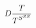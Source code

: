 \def\puzzle{{\mathchoice{D}{T}{S}{SS}}}
$$\puzzle{\puzzle\over\puzzle^{\puzzle^\puzzle}}$$






\bye


